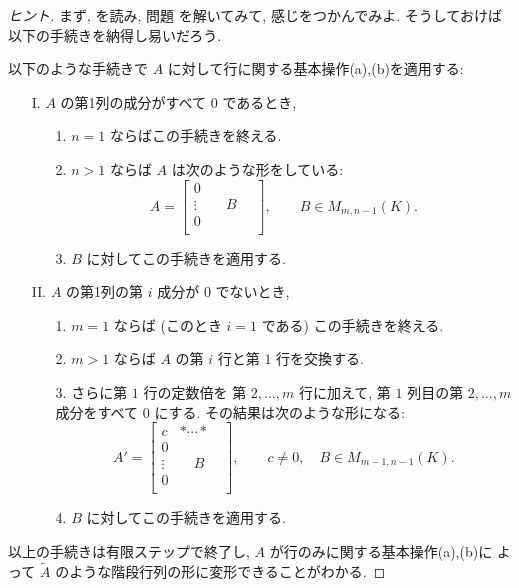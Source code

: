 \documentclass[12pt,twoside]{jarticle}
\begin{document}
\begin{proof}[ヒント]
  まず, を読み, 
  問題  を解いてみて, 感じをつかんでみよ.
  そうしておけば以下の手続きを納得し易いだろう.

  以下のような手続きで $A$ に対して行に関する基本操作(a),(b)を適用する:
  \begin{enumerate}
  \item[I.] $A$ の第1列の成分がすべて $0$ であるとき,
    \begin{enumerate}
    \item[1.] $n=1$ ならばこの手続きを終える.
    \item[2.] $n>1$ ならば $A$ は次のような形をしている:
      \begin{equation*}
        A = 
        \left[
          \begin{array}{c|c}
            0      & \\
            \vdots & \quad B \quad \\
            0      & \\
          \end{array}
        \right],
        \qquad B\in M_{m,n-1}(K).
      \end{equation*}
      \item[3.] $B$ に対してこの手続きを適用する.
    \end{enumerate}
  \item[II.] $A$ の第1列の第 $i$ 成分が $0$ でないとき,
    \begin{enumerate}
    \item[1.] $m=1$ ならば (このとき $i=1$ である) この手続きを終える.
    \item[2.] $m>1$ ならば $A$ の第 $i$ 行と第 $1$ 行を交換する.
    \item[3.] さらに第 $1$ 行の定数倍を 第 $2,\ldots,m$ 行に加えて,
      第 $1$ 列目の第 $2,\ldots,m$ 成分をすべて $0$ にする.
      その結果は次のような形になる:
      \begin{equation*}
        A' =
        \left[
          \begin{array}{c|c}
            c      & * \cdots * \\
            \hline
            0      & \\
            \vdots & \quad B \quad \\
            0      & \\
          \end{array}
        \right],
        \qquad c\ne 0, \quad B\in M_{m-1,n-1}(K).
      \end{equation*}
    \item[4.] $B$ に対してこの手続きを適用する.
    \end{enumerate}
  \end{enumerate}
  以上の手続きは有限ステップで終了し, $A$ が行のみに関する基本操作(a),(b)に
  よって $\tilde{A}$ のような階段行列の形に変形できることがわかる.


\end{proof}
\end{document}
